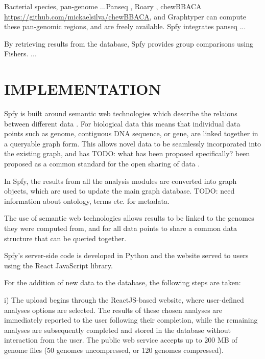 \documentclass[a4,center,fleqn]{NAR}
\begin{document}

Bacterial species, pan-genome ...Panseq \cite{laing2010pan}, Roary \cite{page2015roary}, chewBBACA \url{https://github.com/mickaelsilva/chewBBACA}, and Graphtyper \cite{Eggertsson148403} can compute these pan-genomic regions, and are freely available.
Spfy integrates panseq ...

By retrieving results from the database, Spfy provides group comparisons using Fishers.
...


\section{IMPLEMENTATION}
Spfy is built around semantic web technologies which describe the relaions between different data \cite{berners2001semantic}. For biological data this means that individual data points such as genome, contiguous DNA sequence, or gene, are linked together in a queryable graph form. This allows novel data to be seamlessly incorporated into the existing graph, and has {TODO: what has been proposed specifically?} been proposed as a common standard for the open sharing of data \cite{horrocks2005semantic}.

In Spfy, the results from all the analysis modules are converted into graph objects, which are used to update the main graph database. TODO: need information about ontology, terms etc. for metadata.

The use of semantic web technologies allows results to be linked to the genomes they were computed from, and for all data points to share a common data structure that can be queried together.

Spfy's server-side code is developed in Python and the website served to users using the React JavaScript library.

For the addition of new data to the database, the following steps are taken:

i) The upload begins through the ReactJS-based website, where user-defined analyses options are selected. The results of these chosen analyses are immediately reported to the user following their completion, while the remaining analyses are subsequently completed and stored in the database without interaction from the user. The public web service accepts up to 200 MB of genome files (50 genomes uncompressed, or 120 genomes compressed).
\end{document}
